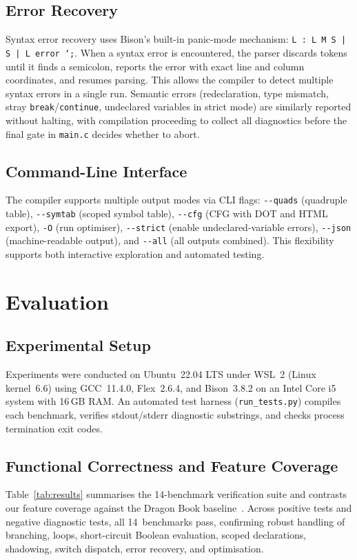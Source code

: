 \documentclass[conference]{IEEEtran}
\begin{document}
\subsection{Error Recovery}
Syntax error recovery uses Bison's built-in panic-mode mechanism: \texttt{L : L M S | S | L error `;\textquotesingle}. When a syntax error is encountered, the parser discards tokens until it finds a semicolon, reports the error with exact line and column coordinates, and resumes parsing. This allows the compiler to detect multiple syntax errors in a single run. Semantic errors (redeclaration, type mismatch, stray \texttt{break}/\texttt{continue}, undeclared variables in strict mode) are similarly reported without halting, with compilation proceeding to collect all diagnostics before the final gate in \texttt{main.c} decides whether to abort.

\subsection{Command-Line Interface}
The compiler supports multiple output modes via CLI flags: \texttt{-{}-quads} (quadruple table), \texttt{-{}-symtab} (scoped symbol table), \texttt{-{}-cfg} (CFG with DOT and HTML export), \texttt{-O} (run optimiser), \texttt{-{}-strict} (enable undeclared-variable errors), \texttt{-{}-json} (machine-readable output), and \texttt{-{}-all} (all outputs combined). This flexibility supports both interactive exploration and automated testing.

\section{Evaluation}
\label{sec:eval}
\balance

\subsection{Experimental Setup}
Experiments were conducted on Ubuntu~22.04 LTS under WSL~2 (Linux kernel~6.6) using GCC~11.4.0, Flex~2.6.4, and Bison~3.8.2 on an Intel Core i5 system with 16\,GB RAM. An automated test harness (\texttt{run\_tests.py}) compiles each benchmark, verifies stdout/stderr diagnostic substrings, and checks process termination exit codes.

\subsection{Functional Correctness and Feature Coverage}
Table~\ref{tab:results} summarises the 14-benchmark verification suite and contrasts our feature coverage against the Dragon Book baseline~\cite{dragonbook}. Across positive tests and negative diagnostic tests, all 14~benchmarks pass, confirming robust handling of branching, loops, short-circuit Boolean evaluation, scoped declarations, shadowing, switch dispatch, error recovery, and optimisation.
\end{document}
